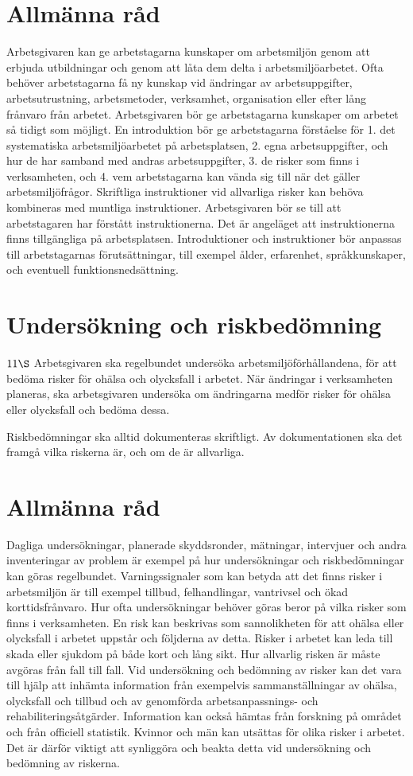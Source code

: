 \section*{Allmänna råd}
Arbetsgivaren kan ge arbetstagarna kunskaper om arbetsmiljön genom att erbjuda utbildningar och genom att låta dem delta i arbetsmiljöarbetet. Ofta behöver arbetstagarna få ny kunskap vid ändringar av arbetsuppgifter, arbetsutrustning, arbetsmetoder, verksamhet, organisation eller efter lång frånvaro från arbetet.
Arbetsgivaren bör ge arbetstagarna kunskaper om arbetet så tidigt som möjligt. En introduktion bör ge arbetstagarna förståelse för
1. det systematiska arbetsmiljöarbetet på arbetsplatsen,
2. egna arbetsuppgifter, och hur de har samband med andras arbetsuppgifter,
3. de risker som finns i verksamheten, och
4. vem arbetstagarna kan vända sig till när det gäller arbetsmiljöfrågor.
Skriftliga instruktioner vid allvarliga risker kan behöva kombineras med muntliga instruktioner. Arbetsgivaren bör se till att arbetstagaren har förstått instruktionerna. Det är angeläget att instruktionerna finns tillgängliga på arbetsplatsen.
Introduktioner och instruktioner bör anpassas till arbetstagarnas förutsättningar, till exempel ålder, erfarenhet, språkkunskaper, och eventuell funktionsnedsättning.
\section*{Undersökning och riskbedömning}
\(11 \S\) Arbetsgivaren ska regelbundet undersöka arbetsmiljöförhållandena, för att bedöma risker för ohälsa och olycksfall i arbetet.
När ändringar i verksamheten planeras, ska arbetsgivaren undersöka om ändringarna medför risker för ohälsa eller olycksfall och bedöma dessa.

Riskbedömningar ska alltid dokumenteras skriftligt. Av dokumentationen ska det framgå vilka riskerna är, och om de är allvarliga.
\section*{Allmänna råd}
Dagliga undersökningar, planerade skyddsronder, mätningar, intervjuer och andra inventeringar av problem är exempel på hur undersökningar och riskbedömningar kan göras regelbundet. Varningssignaler som kan betyda att det finns risker i arbetsmiljön är till exempel tillbud, felhandlingar, vantrivsel och ökad korttidsfrånvaro. Hur ofta undersökningar behöver göras beror på vilka risker som finns i verksamheten.
En risk kan beskrivas som sannolikheten för att ohälsa eller olycksfall i arbetet uppstår och följderna av detta. Risker i arbetet kan leda till skada eller sjukdom på både kort och lång sikt. Hur allvarlig risken är måste avgöras från fall till fall.
Vid undersökning och bedömning av risker kan det vara till hjälp att inhämta information från exempelvis sammanställningar av ohälsa, olycksfall och tillbud och av genomförda arbetsanpassnings- och rehabiliteringsåtgärder. Information kan också hämtas från forskning på området och från officiell statistik. Kvinnor och män kan utsättas för olika risker i arbetet. Det är därför viktigt att synliggöra och beakta detta vid undersökning och bedömning av riskerna.
